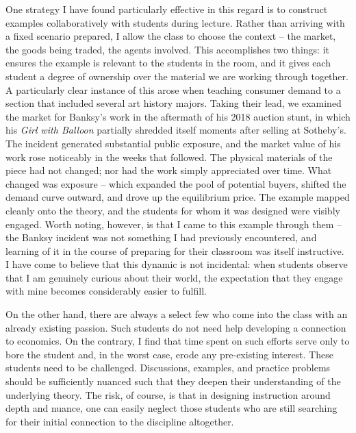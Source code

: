 \documentclass[12pt]{article}
\begin{document}
One strategy I have found particularly effective in this regard is to construct examples collaboratively with students during lecture. Rather than arriving with a fixed scenario prepared, I allow the class to choose the context -- the market, the goods being traded, the agents involved. This accomplishes two things: it ensures the example is relevant to the students in the room, and it gives each student a degree of ownership over the material we are working through together. A particularly clear instance of this arose when teaching consumer demand to a section that included several art history majors. Taking their lead, we examined the market for Banksy's work in the aftermath of his 2018 auction stunt, in which his \textit{Girl with Balloon} partially shredded itself moments after selling at Sotheby's. The incident generated substantial public exposure, and the market value of his work rose noticeably in the weeks that followed. The physical materials of the piece had not changed; nor had the work simply appreciated over time. What changed was exposure -- which expanded the pool of potential buyers, shifted the demand curve outward, and drove up the equilibrium price. The example mapped cleanly onto the theory, and the students for whom it was designed were visibly engaged. Worth noting, however, is that I came to this example through them -- the Banksy incident was not something I had previously encountered, and learning of it in the course of preparing for their classroom was itself instructive. I have come to believe that this dynamic is not incidental: when students observe that I am genuinely curious about their world, the expectation that they engage with mine becomes considerably easier to fulfill. 

On the other hand, there are always a select few who come into the class with an already existing passion. Such students do not need help developing a connection to economics. On the contrary, I find that time spent on such efforts serve only to bore the student and, in the worst case, erode any pre-existing interest. These students need to be challenged. Discussions, examples, and practice problems should be sufficiently nuanced such that they deepen their understanding of the underlying theory. The risk, of course, is that in designing instruction around depth and nuance, one can easily neglect those students who are still searching for their initial connection to the discipline altogether.
\end{document}
